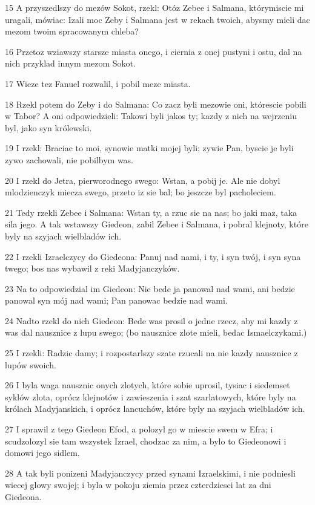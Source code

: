 \par 15 A przyszedlszy do mezów Sokot, rzekl: Otóz Zebee i Salmana, którymiscie mi uragali, mówiac: Izali moc Zeby i Salmana jest w rekach twoich, abysmy mieli dac mezom twoim spracowanym chleba?
\par 16 Przetoz wziawszy starsze miasta onego, i ciernia z onej pustyni i ostu, dal na nich przyklad innym mezom Sokot.
\par 17 Wieze tez Fanuel rozwalil, i pobil meze miasta.
\par 18 Rzekl potem do Zeby i do Salmana: Co zacz byli mezowie oni, którescie pobili w Tabor? A oni odpowiedzieli: Takowi byli jakos ty; kazdy z nich na wejrzeniu byl, jako syn królewski.
\par 19 I rzekl: Braciac to moi, synowie matki mojej byli; zywie Pan, byscie je byli zywo zachowali, nie pobilbym was.
\par 20 I rzekl do Jetra, pierworodnego swego: Wstan, a pobij je. Ale nie dobyl mlodzienczyk miecza swego, przeto iz sie bal; bo jeszcze byl pacholeciem.
\par 21 Tedy rzekli Zebee i Salmana: Wstan ty, a rzuc sie na nas; bo jaki maz, taka sila jego. A tak wstawszy Giedeon, zabil Zebee i Salmana, i pobral klejnoty, które byly na szyjach wielbladów ich.
\par 22 I rzekli Izraelczycy do Giedeona: Panuj nad nami, i ty, i syn twój, i syn syna twego; bos nas wybawil z reki Madyjanczyków.
\par 23 Na to odpowiedzial im Giedeon: Nie bede ja panowal nad wami, ani bedzie panowal syn mój nad wami; Pan panowac bedzie nad wami.
\par 24 Nadto rzekl do nich Giedeon: Bede was prosil o jedne rzecz, aby mi kazdy z was dal nausznice z lupu swego; (bo nausznice zlote mieli, bedac Ismaelczykami.)
\par 25 I rzekli: Radzic damy; i rozpostarlszy szate rzucali na nie kazdy nausznice z lupów swoich.
\par 26 I byla waga nausznic onych zlotych, które sobie uprosil, tysiac i siedemset syklów zlota, oprócz klejnotów i zawieszenia i szat szarlatowych, które byly na królach Madyjanskich, i oprócz lancuchów, które byly na szyjach wielbladów ich.
\par 27 I sprawil z tego Giedeon Efod, a polozyl go w miescie swem w Efra; i scudzolozyl sie tam wszystek Izrael, chodzac za nim, a bylo to Giedeonowi i domowi jego sidlem.
\par 28 A tak byli ponizeni Madyjanczycy przed synami Izraelskimi, i nie podniesli wiecej glowy swojej; i byla w pokoju ziemia przez czterdziesci lat za dni Giedeona.
